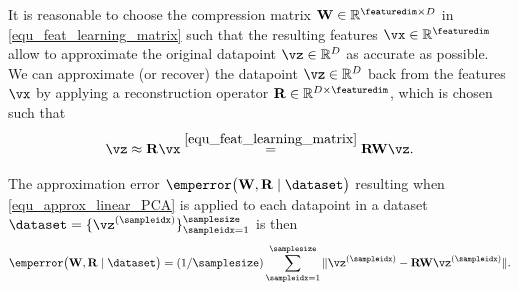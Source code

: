 \documentclass[12pt]{report}
\begin{document}
It is reasonable to choose the compression matrix $\mathbf{W} \in \mathbb{R}^{\featuredim \times D}$ 
in \eqref{equ_feat_learning_matrix} such that the resulting features $\vx \in \mathbb{R}^{\featuredim}$ 
allow to approximate the original datapoint $\vz \in \mathbb{R}^{D}$ as accurate as possible. We can 
approximate (or recover) the datapoint $\vz \in \mathbb{R}^{D}$ back from the features $\vx$ by 
applying a reconstruction operator $\mathbf{R} \in \mathbb{R}^{D \times \featuredim}$, which is 
chosen such that 
\begin{equation} 
\label{equ_approx_linear_PCA}
\vz \approx \mathbf{R} \vx \stackrel{\eqref{equ_feat_learning_matrix}}{=} \mathbf{R} \mathbf{W} \vz. 
\end{equation} 

The approximation error $\emperror \big( \mathbf{W},\mathbf{R} \mid \dataset\big)$ resulting 
when \eqref{equ_approx_linear_PCA} is applied to each datapoint in a 
dataset $\dataset=  \{ \vz^{(\sampleidx)}\}_{\sampleidx=1}^{\samplesize}$ is then
\begin{equation} 
\label{equ_app_error_PCA}
\emperror \big( \mathbf{W},\mathbf{R} \mid \dataset\big) = (1/\samplesize) \sum_{\sampleidx=1}^{\samplesize} \| \vz^{(\sampleidx)} - \mathbf{R} \mathbf{W} \vz^{(\sampleidx)} \|. 
\end{equation} 
\end{document}
